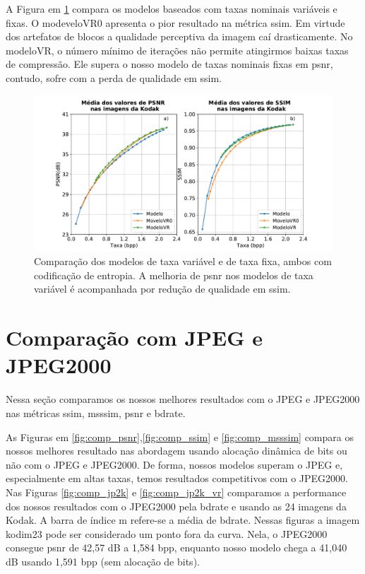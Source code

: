A Figura em \ref{fig:comp_vr} compara os modelos baseados com taxas nominais variáveis e fixas. O modeveloVR0 apresenta o pior resultado na métrica \acrshort{ssim}. Em virtude dos artefatos de blocos a qualidade perceptiva da imagem caí drasticamente. No modeloVR, o número mínimo de iterações não permite atingirmos baixas taxas de compressão. Ele supera o nosso modelo de taxas nominais fixas em \acrshort{psnr}, contudo, sofre com a perda de qualidade em \acrshort{ssim}.      

\begin{figure}
	\centering
	\includegraphics[width=1.0\textwidth]{figuras/com_vr.pdf}
	\caption[Comparação dos modelos de taxa variável e taxa fixa.]{Comparação dos modelos de taxa variável e de taxa fixa, ambos com codificação de entropia. A melhoria de \acrshort{psnr} nos modelos de taxa variável é acompanhada por redução de qualidade em \acrshort{ssim}.}  	
	\label{fig:comp_vr}
\end{figure}

\section{Comparação com JPEG e JPEG2000}

Nessa seção comparamos os nossos melhores resultados com o JPEG e JPEG2000 nas métricas \acrshort{ssim}, \acrshort{msssim}, \acrshort{psnr} e \acrshort{bdrate}. 


As Figuras em \ref{fig:comp_psnr},\ref{fig:comp_ssim} e \ref{fig:comp_msssim} compara os nossos melhores resultado nas abordagem usando alocação dinâmica de bits ou não com o JPEG e JPEG2000. De forma, nossos modelos superam o JPEG e, especialmente em altas taxas, temos resultados competitivos com o JPEG2000.  
Nas Figuras  \ref{fig:comp_jp2k} e \ref{fig:comp_jp2k_vr} comparamos a performance dos nossos resultados com o JPEG2000 pela \acrshort{bdrate} e usando as 24 imagens da Kodak. A barra de índice m refere-se a média de \acrshort{bdrate}. Nessas figuras a imagem kodim23 pode ser considerado um ponto fora da curva. Nela, o JPEG2000 consegue \acrshort{psnr} de 42,57 dB a 1,584 bpp, enquanto nosso modelo chega a 41,040 dB usando 1,591 bpp (sem alocação de bits).  


